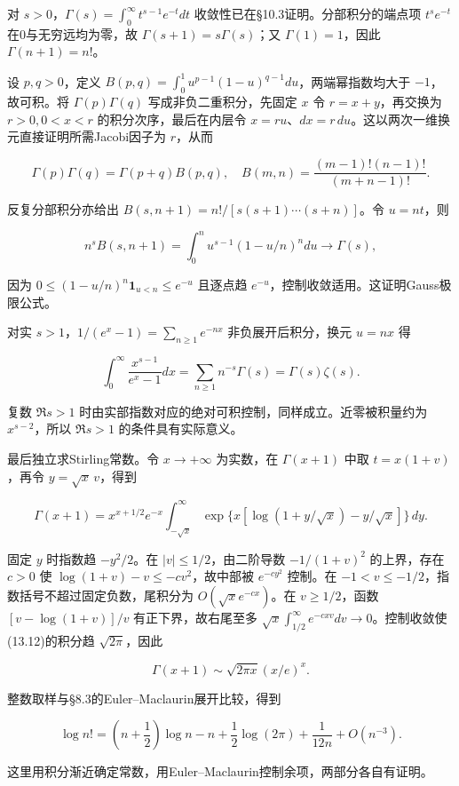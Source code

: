 \documentclass[11pt,a4paper]{article}
\begin{document}
对 \(s>0\)，\(\Gamma(s)=\int_0^\infty t^{s-1}e^{-t}dt\)
收敛性已在§10.3证明。分部积分的端点项 \(t^se^{-t}\)
在0与无穷远均为零，故 \(\Gamma(s+1)=s\Gamma(s)\)；又
\(\Gamma(1)=1\)，因此 \(\Gamma(n+1)=n!\)。

设 \(p,q>0\)，定义
\(B(p,q)=\int_0^1u^{p-1}(1-u)^{q-1}du\)，两端幂指数均大于
\(-1\)，故可积。将 \(\Gamma(p)\Gamma(q)\) 写成非负二重积分，先固定 \(x\)
令 \(r=x+y\)，再交换为 \(r>0,0<x<r\) 的积分次序，最后在内层令
\(x=ru\)、\(dx=r\,du\)。这以两次一维换元直接证明所需Jacobi因子为
\(r\)，从而

\[
\Gamma(p)\Gamma(q)=\Gamma(p+q)B(p,q),\quad
B(m,n)=\frac{(m-1)!(n-1)!}{(m+n-1)!}.\tag{13.10}
\]

反复分部积分亦给出 \(B(s,n+1)=n!/[s(s+1)\cdots(s+n)]\)。令 \(u=nt\)，则

\[
n^sB(s,n+1)=\int_0^nu^{s-1}(1-u/n)^n du\longrightarrow\Gamma(s),
\]

因为 \(0\le(1-u/n)^n\mathbf1_{u<n}\le e^{-u}\) 且逐点趋
\(e^{-u}\)，控制收敛适用。这证明Gauss极限公式。

对实 \(s>1\)，\(1/(e^x-1)=\sum_{n\ge1}e^{-nx}\) 非负展开后积分，换元
\(u=nx\) 得

\[
\int_0^\infty\frac{x^{s-1}}{e^x-1}dx
=\sum_{n\ge1}n^{-s}\Gamma(s)=\Gamma(s)\zeta(s).\tag{13.11}
\]

复数 \(\Re s>1\)
时由实部指数对应的绝对可积控制，同样成立。近零被积量约为
\(x^{s-2}\)，所以 \(\Re s>1\) 的条件具有实际意义。

最后独立求Stirling常数。令 \(x\to+\infty\) 为实数，在 \(\Gamma(x+1)\)
中取 \(t=x(1+v)\)，再令 \(y=\sqrt x\,v\)，得到

\[
\Gamma(x+1)=x^{x+1/2}e^{-x}
\int_{-\sqrt x}^\infty
\exp\{x[\log(1+y/\sqrt x)-y/\sqrt x]\}\,dy.\tag{13.12}
\]

固定 \(y\) 时指数趋 \(-y^2/2\)。在 \(|v|\le1/2\)，由二阶导数
\(-1/(1+v)^2\) 的上界，存在 \(c>0\) 使 \(\log(1+v)-v\le-cv^2\)，故中部被
\(e^{-cy^2}\) 控制。在 \(-1<v\le-1/2\)，指数括号不超过固定负数，尾积分为
\(O(\sqrt x e^{-cx})\)。在 \(v\ge1/2\)，函数 \([v-\log(1+v)]/v\)
有正下界，故右尾至多
\(\sqrt x\int_{1/2}^\infty e^{-cxv}dv\to0\)。控制收敛使(13.12)的积分趋
\(\sqrt{2\pi}\)，因此

\[
\Gamma(x+1)\sim\sqrt{2\pi x}(x/e)^x.
\]

整数取样与§8.3的Euler--Maclaurin展开比较，得到

\[
\log n!=\left(n+\frac12\right)\log n-n+\frac12\log(2\pi)
+\frac1{12n}+O(n^{-3}).\tag{13.13}
\]

这里用积分渐近确定常数，用Euler--Maclaurin控制余项，两部分各自有证明。
\end{document}
